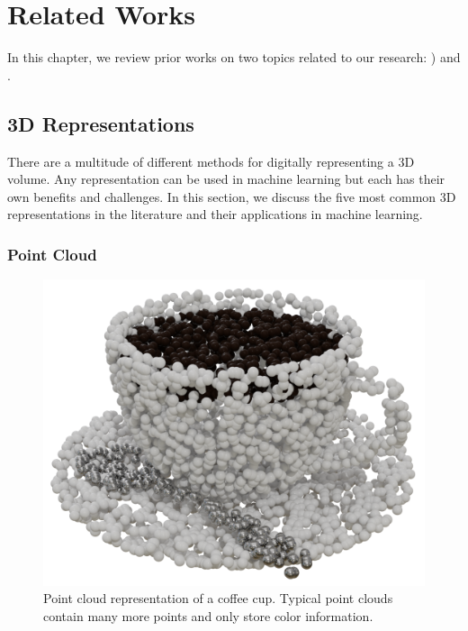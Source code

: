 
\chapter{Related Works}
\label{chap:related_works}

In this chapter, we review prior works on two topics related to our research: ) and .

\section{3D Representations}
\label{sec:3d_representations}

There are a multitude of different methods for digitally representing a 3D volume. Any representation can be used in machine learning but each has their own benefits and challenges. In this section, we discuss the five most common 3D representations in the literature and their applications in machine learning.


\subsection{Point Cloud}
\label{subsec:point_cloud}

\begin{figure}[h]
	\centering
	\includegraphics[scale=0.2]{Images/Point Cloud Cup}
	\caption{Point cloud representation of a coffee cup. Typical point clouds contain many more points and only store color information.}
	\label{fig:point_cloud_cup}
\end{figure}

